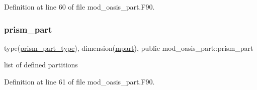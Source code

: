 Definition at line 60 of file mod\+\_\+oasis\+\_\+part.\+F90.

\mbox{\label{namespacemod__oasis__part_a326ce52f630ba7e71905af864a6cb2dc}} 
\subsubsection{\texorpdfstring{prism\+\_\+part}{prism\_part}}
{\footnotesize\ttfamily type(\hyperlink{structmod__oasis__part_1_1prism__part__type}{prism\+\_\+part\+\_\+type}), dimension(\hyperlink{namespacemod__oasis__part_ab68d087792db0351181c9a97025d793b}{mpart}), public mod\+\_\+oasis\+\_\+part\+::prism\+\_\+part}



list of defined partitions 



Definition at line 61 of file mod\+\_\+oasis\+\_\+part.\+F90.

